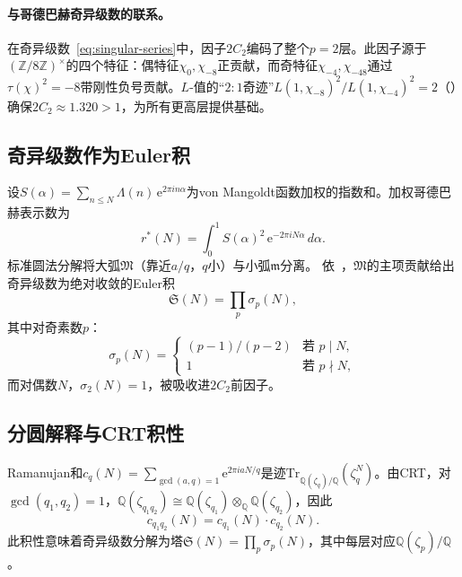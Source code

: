 \documentclass[11pt,a4paper]{article}
\theoremstyle{remark}
\newcommand{\Z}{\mathbb{Z}}
\newcommand{\Q}{\mathbb{Q}}
\newcommand{\mM}{\mathfrak{M}}
\newcommand{\mm}{\mathfrak{m}}
\newcommand{\e}{\mathrm{e}}
\begin{document}
\paragraph{与哥德巴赫奇异级数的联系。}
在奇异级数~\eqref{eq:singular-series}中，因子$2C_2$编码了整个$p = 2$层。此因子源于$(\Z/8\Z)^\times$的四个特征：偶特征$\chi_0, \chi_{-8}$正贡献，而奇特征$\chi_{-4}, \chi_{-48}$通过$\tau(\chi)^2 = -8$带刚性负号贡献。$L$-值的``$2{:}1$奇迹''$L(1,\chi_{-8})^2 / L(1,\chi_{-4})^2 = 2$（）确保$2C_2 \approx 1.320 > 1$，为所有更高层提供基础。

\subsection{奇异级数作为Euler积}
\label{subsec:euler-product}

设$S(\alpha) = \sum_{n \leq N}\Lambda(n)\,\e^{2\pi i n\alpha}$为von Mangoldt函数加权的指数和。加权哥德巴赫表示数为
\begin{equation}
\label{eq:circle-integral}
  r^*(N) = \int_0^1 S(\alpha)^2\,\e^{-2\pi i N\alpha}\,d\alpha.
\end{equation}
标准圆法分解将大弧$\mM$（靠近$a/q$，$q$小）与小弧$\mm$分离。
依~\cite{IwaniecKowalski2004}，$\mM$的主项贡献给出奇异级数为绝对收敛的Euler积
\begin{equation}
\label{eq:sing-series-full}
  \mathfrak{S}(N) = \prod_p \sigma_p(N),
\end{equation}
其中对奇素数$p$：
\begin{equation}
\label{eq:local-factor-odd}
  \sigma_p(N) = \begin{cases}
    (p-1)/(p-2) & \text{若 } p \mid N, \\
    1 & \text{若 } p \nmid N,
  \end{cases}
\end{equation}
而对偶数$N$，$\sigma_2(N) = 1$，被吸收进$2C_2$前因子。

\subsection{分圆解释与CRT积性}
\label{subsec:cyclotomic}

Ramanujan和$c_q(N) = \sum_{\gcd(a,q)=1} \e^{2\pi i aN/q}$是迹$\mathrm{Tr}_{\Q(\zeta_q)/\Q}(\zeta_q^N)$。由CRT，对$\gcd(q_1,q_2)=1$，$\Q(\zeta_{q_1 q_2}) \cong \Q(\zeta_{q_1}) \otimes_\Q \Q(\zeta_{q_2})$，因此
\begin{equation}
\label{eq:crt-trace}
  c_{q_1 q_2}(N) = c_{q_1}(N) \cdot c_{q_2}(N).
\end{equation}
此积性意味着奇异级数分解为塔$\mathfrak{S}(N) = \prod_p \sigma_p(N)$，其中每层对应$\Q(\zeta_p)/\Q$。
\end{document}
